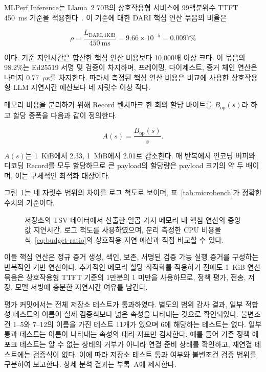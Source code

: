 \documentclass[10pt]{article}
\begin{document}
MLPerf Inference는 Llama~2 70B의 상호작용형 서비스에 99백분위수 TTFT 450~ms 기준을 적용한다~\cite{mlperf2025llm}. 이 기준에 대한 DARI 핵심 연산 묶음의 비율은

\begin{equation}
\rho = \frac{L_{\mathrm{DARI},1\mathrm{KiB}}}{450~\mathrm{ms}}
= 9.66 \times 10^{-5} = 0.0097\%
\label{eq:budget-ratio}
\end{equation}

이다. 기준 지연시간은 합산한 핵심 연산 비용보다 10,000배 이상 크다. 이 묶음의 98.2\%는 Ed25519 서명 및 검증이 차지하며, 프레이밍, 다이제스트, 증거 체인 연산은 나머지 0.77~$\mu$s를 차지한다. 따라서 측정된 핵심 연산 비용은 비교에 사용한 상호작용형 LLM 지연시간 예산보다 네 자릿수 이상 작다.

메모리 비용을 분리하기 위해 Record 벤치마크 한 회의 할당 바이트를 $B_{\mathrm{op}}(s)$라 하고 할당 증폭을 다음과 같이 정의한다.

\begin{equation}
A(s) = \frac{B_{\mathrm{op}}(s)}{s}.
\label{eq:allocation}
\end{equation}

$A(s)$는 1~KiB에서 2.33, 1~MiB에서 2.01로 감소한다. 매 반복에서 인코딩 버퍼와 디코딩 Record를 모두 할당하므로 큰 payload의 할당량은 payload 크기의 약 두 배이며, 이는 구체적인 최적화 대상이다.

그림~\ref{fig:primitive-latency}는 네 자릿수 범위의 차이를 로그 척도로 보이며, 표~\ref{tab:microbench}가 정확한 수치의 기준이다.

\begin{figure}[H]
  \centering
  
  \caption{저장소의 TSV 데이터에서 산출한 일곱 가지 메모리 내 핵심 연산의 중앙값 지연시간. 로그 척도를 사용하였으며, 분리 측정한 CPU 비용을 식~\ref{eq:budget-ratio}의 상호작용 지연 예산과 직접 비교할 수 있다.}
  \label{fig:primitive-latency}
\end{figure}

이들 핵심 연산은 정규 증거 생성, 색인, 보존, 서명된 검증 가능 실행 증거를 구성하는 반복적인 기반 연산이다. 추가적인 메모리 할당 최적화를 적용하기 전에도 1~KiB 연산 묶음은 상호작용형 TTFT 기준의 1만분의 1 미만을 사용하므로, 정책 평가, 전송, 저장, 모델 서빙에 충분한 지연시간 여유를 남긴다.

평가 커밋에서는 전체 저장소 테스트가 통과하였다. 별도의 범위 감사 결과, 일부 적합성 테스트의 이름이 실제 검증식보다 넓은 속성을 나타내는 것으로 확인되었다. 불변조건 1--5와 7--12의 이름을 가진 테스트 11개가 있으며 6에 해당하는 테스트는 없다. 일부 통과 테스트는 이름이 나타내는 속성의 대리 지표만 검사한다. 예를 들어 기존 정책 에포크 테스트는 알 수 없는 상태의 거부가 아니라 연결 준비 상태를 확인하고, 재연결 테스트에는 검증식이 없다. 이에 따라 저장소 테스트 통과 여부와 불변조건 검증 범위를 구분하여 보고한다. 상세 분석 결과는 부록~A에 제시한다.
\end{document}
